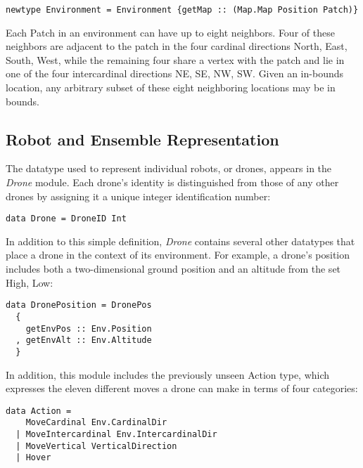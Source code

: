 
\begin{verbatim}
newtype Environment = Environment {getMap :: (Map.Map Position Patch)}
\end{verbatim}

Each Patch in an environment can have up to eight neighbors. Four of these neighbors are adjacent to the patch in the four cardinal directions {North, East, South, West}, while the remaining four share a vertex with the patch and lie in one of the four intercardinal directions {NE, SE, NW, SW}. Given an in-bounds location, any arbitrary subset of these eight neighboring locations may be in bounds.

\subsection{Robot and Ensemble Representation}


The datatype used to represent individual robots, or drones, appears in the \textit{Drone} module. Each drone's identity is distinguished from those of any other drones by assigning it a unique integer identification number:

\begin{verbatim}
data Drone = DroneID Int
\end{verbatim}

In addition to this simple definition, \textit{Drone} contains several other datatypes that place a drone in the context of its environment. For example, a drone's position includes both a two-dimensional ground position and an altitude from the set {High, Low}:

\begin{verbatim}
data DronePosition = DronePos 
  {
    getEnvPos :: Env.Position
  , getEnvAlt :: Env.Altitude
  }
\end{verbatim}

In addition, this module includes the previously unseen Action type, which expresses the eleven different moves a drone can make in terms of four categories:

\begin{verbatim}
data Action =
    MoveCardinal Env.CardinalDir
  | MoveIntercardinal Env.IntercardinalDir
  | MoveVertical VerticalDirection
  | Hover
\end{verbatim}

